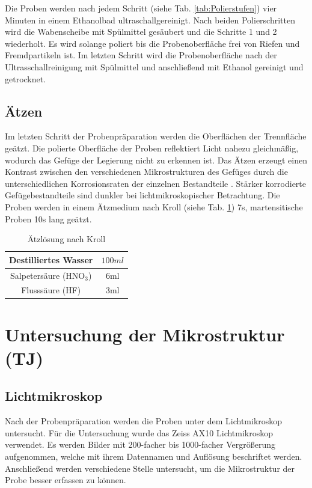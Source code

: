 Die Proben werden nach jedem Schritt (siehe Tab. \ref{tab:Polierstufen}) vier Minuten in einem Ethanolbad ultraschallgereinigt. Nach beiden Polierschritten wird die Wabenscheibe mit Spülmittel gesäubert und die Schritte 1 und 2 wiederholt. Es wird solange poliert bis die Probenoberfläche frei von Riefen und Fremdpartikeln ist. Im letzten Schritt wird die Probenoberfläche nach der Ultrasschallreinigung mit Spülmittel und anschließend mit Ethanol gereinigt und getrocknet. 



\subsection{Ätzen}

Im letzten Schritt der Probenpräparation werden die Oberflächen der Trennfläche geätzt. Die polierte Oberfläche der Proben reflektiert Licht nahezu gleichmäßig, wodurch das Gefüge der Legierung nicht zu erkennen ist. Das Ätzen erzeugt einen Kontrast zwischen den verschiedenen Mikrostrukturen des Gefüges durch die unterschiedlichen Korrosionsraten der einzelnen Bestandteile \cite{Lutjering.2007}. Stärker korrodierte Gefügebestandteile sind dunkler bei lichtmikroskopischer Betrachtung.
Die Proben werden in einem Ätzmedium nach Kroll (siehe Tab. \ref{tab:Ätz_Kroll}) 7s, martensitische Proben 10s lang geätzt. 

\begin{table}[]
	\centering
	\begin{tabular}{|c|c|}
		
		\hline 
		Destilliertes Wasser
		& $100ml$
		\\ 
		\hline 
		Salpetersäure (HNO$_{3}$)	& 6ml
		\\ 
		\hline 
		Flusssäure (HF) & 3ml
		\\ 
		\hline 
	\end{tabular} 
	\caption{Ätzlösung nach Kroll}
	\label{tab:Ätz_Kroll}
\end{table}

\section{Untersuchung der Mikrostruktur (TJ)}

\subsection{Lichtmikroskop}

Nach der Probenpräparation werden die Proben unter dem Lichtmikroskop untersucht. Für die Untersuchung wurde das Zeiss AX10 Lichtmikroskop verwendet. Es werden Bilder mit 200-facher bis 1000-facher Vergrößerung aufgenommen, welche mit ihrem Datennamen und Auflösung beschriftet werden. Anschließend werden verschiedene Stelle untersucht, um die Mikrostruktur der Probe besser erfassen zu können.

